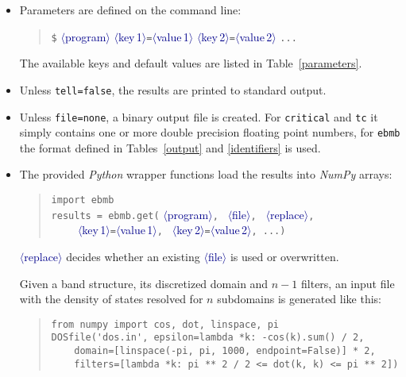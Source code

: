 \documentclass[a4paper]{article}
\def\dummy#1{\textcolor{darkblue}{$\langle$#1$\rangle$}}
\begin{document}
   \begin{itemize}
      \item
         Parameters are defined on the command line:
         \begin{quote}
            \verb|$| \dummy{program}
               \dummy{key\,1}\verb|=|\dummy{value\,1}
               \dummy{key\,2}\verb|=|\dummy{value\,2} \verb|...|
         \end{quote}
         The available keys and default values are listed in
         Table~\ref{parameters}.

      \item
         Unless \texttt{tell=false}, the results are printed to standard output.

      \item
         Unless \texttt{file=none}, a binary output file is created. For
         \texttt{critical} and \texttt{tc} it simply contains one or more double
         precision floating point numbers, for \texttt{ebmb} the format defined
         in Tables~\ref{output} and \ref{identifiers} is used.

      \item
         The provided \emph{Python} wrapper functions load the results into
         \emph{NumPy} arrays:
         \begin{quote}
            \verb|import ebmb| \\
            \verb|results = ebmb.get(|%
            \dummy{program}\verb|, |%
            \dummy{file}\verb|, |%
            \dummy{replace}\verb|,| \\
            \verb|    |%
               \dummy{key\,1}\verb|=|\dummy{value\,1}\verb|, |%
               \dummy{key\,2}\verb|=|\dummy{value\,2}\verb|, ...|\verb|)|
         \end{quote}
         \dummy{replace} decides whether an existing \dummy{file} is used or
         overwritten.

         Given a band structure, its discretized domain and $n - 1$ filters, an
         input file with the density of states resolved for $n$ subdomains is
         generated like this:
         \begin{quote}
            \verb|from numpy import cos, dot, linspace, pi| \\
            \verb|DOSfile('dos.in', epsilon=lambda *k: -cos(k).sum() / 2, | \\
            \verb|    domain=[linspace(-pi, pi, 1000, endpoint=False)] * 2,| \\
            \verb|    filters=[lambda *k: pi ** 2 / 2 <= dot(k, k) <= pi ** 2])|
         \end{quote}
   \end{itemize}
\end{document}
